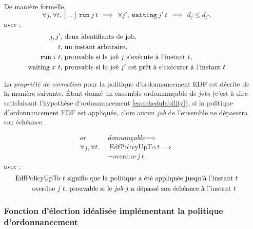 	De manière formelle,
	\begin{equation}
		\forall j, \forall t, [...]~\mathtt{run}~j~t~~\implies~~\forall j',~\mathtt{waiting}~j'~t~~\implies~~d_j \leq d_{j'}.
	\end{equation}
\indent avec :
	\begin{align*}
		j, j'&\text{, deux identifiants de job},\\
		t&\text{, un instant arbitraire},\\
		\mathtt{run}~i~t&\text{, prouvable si le \emph{job} $j$ s'exécute à l'instant $t$},\\ 
		\text{waiting}~x~t&\text{, prouvable si le \emph{job} $j'$ est prêt à s'exécuter à l'instant $t$}
	\end{align*}

	La \emph{propriété de correction} pour la politique d'ordonnancement EDF est décrite de la manière suivante.
	Étant donné un ensemble ordonnançable de \emph{jobs} (c'est à dire satisfaisant l'hypothèse d'ordonnancement \ref{eq:schedulability}), si la politique d'ordonnancement EDF est appliquée, alors aucun \emph{job} de l'ensemble ne dépassera son échéance.
	
	\begin{equation}
	\begin{split}
		\textit{or}&\textit{donnançable} \implies\\
		\forall j, \forall t.~~&~\text{EdfPolicyUpTo}~t \implies\\
		           &\neg \text{overdue}~j~t.
	\end{split}
	\end{equation}
\indent	avec :
	\begin{align*}
		\text{EdfPolicyUpTo}~t&\text{ signifie que la politique a été appliquée jusqu'à l'instant}~t\\
		\text{overdue}~j~t&\text{, prouvable si le \emph{job} $j$ a dépassé son échéance à l'instant}~t
	\end{align*}

	\subsubsection{Fonction d'élection idéalisée implémentant la politique d'ordonnancement}
	\label{sec:functional}

